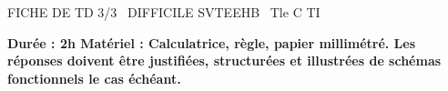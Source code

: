 \documentclass[11pt]{article}
\begin{document}
\begin{tcolorbox}[enhanced,colback=popink,colframe=popink,arc=10pt,boxrule=0pt,left=12pt,right=12pt,top=9pt,bottom=9pt]
{\color{white}\popxbold\small FICHE DE TD 3/3 \textbullet\ DIFFICILE \hfill SVTEEHB \textbullet\ Tle C TI\par}
\end{tcolorbox}
\vspace{4pt}
\textbf{Durée : 2h \quad Matériel : Calculatrice, règle, papier millimétré. Les réponses doivent être justifiées, structurées et illustrées de schémas fonctionnels le cas échéant.}
\end{document}
